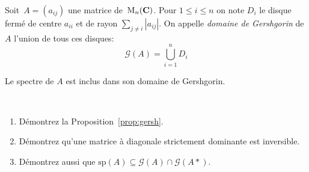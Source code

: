 \begin{definition}
	Soit~$A=(a_{ij})$ une matrice de~$\mathrm{M}_n(\mathbf{C})$.
Pour $1\leq i\leq n$ on note $D_i$ le disque fermé de centre $a_{ii}$ et de
rayon $\sum_{j\neq i} |a_{ij}|$. On appelle \emph{domaine de Gershgorin} de
$A$ l'union de tous ces disques:
\[
\mathcal G(A) = \bigcup_{i=1}^n D_i
\]
\end{definition}
\begin{proposition}
	\label{prop:gersh}
	Le spectre de $A$ est inclus dans son domaine de Gershgorin.
\end{proposition}

\begin{exercice}$ $
\begin{enumerate}
\item Démontrez la Proposition~\ref{prop:gersh}.
\item Démontrez qu'une matrice à diagonale strictement dominante est inversible.
\item Démontrez aussi que $\mathrm{sp}(A) \subseteq \mathcal G(A) \cap \mathcal
		G(A*)$.
\end{enumerate}
\end{exercice}


